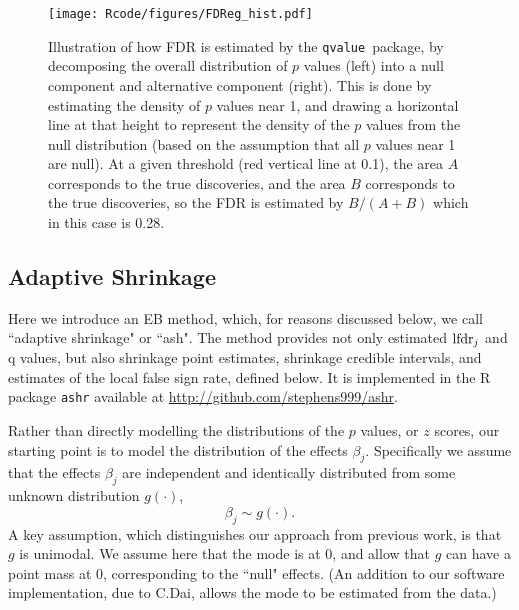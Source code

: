 \documentclass[11pt]{article}
\def\shat{\hat{s}}
\def\qvalue{{\tt qvalue}\xspace}
\def\ashr{{\tt ashr}\xspace}
\begin{document}
  
\begin{figure}
\texttt{[image: Rcode/figures/FDReg\_hist.pdf]}
\caption{Illustration of how FDR is estimated by the \qvalue \, package, by decomposing the overall distribution of $p$ values (left) into a null component and alternative component (right). This is done by estimating the density of $p$ values near 1, and drawing a horizontal line at that height to represent the density of the $p$ values from the null distribution (based on the assumption that all $p$ values near 1 are null).
At a given threshold (red vertical line at 0.1), the area $A$ corresponds to the true discoveries, and the area $B$ corresponds to the true discoveries,
so the FDR is estimated by $B/(A+B)$ which in this case is 0.28.} \label{fig:qvalue}
\end{figure}


 \subsection*{Adaptive Shrinkage}
 

 Here we introduce an EB method, which, for reasons discussed below, we call ``adaptive shrinkage" or ``ash".
 The method provides not only estimated $\text{lfdr}_j$ and q values, but also shrinkage point estimates, shrinkage credible intervals,
 and estimates of the local false sign rate, defined below. It is implemented in the R package \ashr available at \url{http://github.com/stephens999/ashr}.
  
  Rather than directly modelling the distributions of the $p$ values, or $z$ scores, our starting point is to model the distribution of the effects $\beta_j$.
 Specifically we assume that the effects $\beta_j$ are independent and identically distributed from some unknown distribution $g(\cdot)$,
  \begin{equation} \label{eqn:beta}
 \beta_j \sim g(\cdot).
 \end{equation}
 A key assumption, which distinguishes our approach from previous work, is that $g$ is unimodal. We assume here that the mode is at 0, and allow
 that $g$ can have a point mass at 0, corresponding to the ``null" effects. 
 (An addition to our software implementation, due to C.Dai, allows the mode to be estimated from the data.)
 
 \def\dt{\text{dt}}
 
\end{document}
